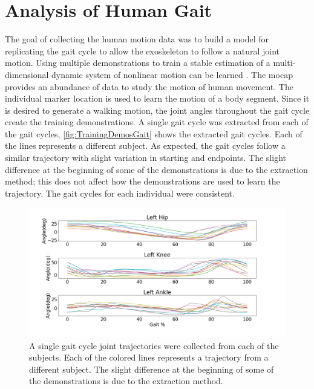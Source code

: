 \section{Analysis of Human Gait}

The goal of collecting the human motion data was to build a model for replicating the gait cycle to allow the exoskeleton to follow a natural joint motion. Using multiple demonstrations to train a stable estimation of a multi-dimensional dynamic system of nonlinear motion can be learned \cite{li2018development}. The mocap provides an abundance of data to study the motion of human movement. The individual marker location is used to learn the motion of a body segment. Since it is desired to generate a walking motion, the joint angles throughout the gait cycle create the training demonstrations. A single gait cycle was extracted from each of the gait cycles,  \autoref{fig:TrainingDemosGait} shows the extracted gait cycles. Each of the lines represents a different subject. As expected, the gait cycles follow a similar trajectory with slight variation in starting and endpoints. The slight difference at the beginning of some of the demonstrations is due to the extraction method; this does not affect how the demonstrations are used to learn the trajectory. The gait cycles for each individual were consistent.

\begin{figure}[h]
    \centering
    \includegraphics[scale=0.30]{images/gait_data/gaittraining.png}
    \caption[Raw Joint Trajectories Collected from the Subjects]{A single gait cycle joint trajectories were collected from each of the subjects. Each of the colored lines represents a trajectory from a different subject. The slight difference at the beginning of some of the demonstrations is due to the extraction method.}
    \label{fig:TrainingDemosGait}
\end{figure}


